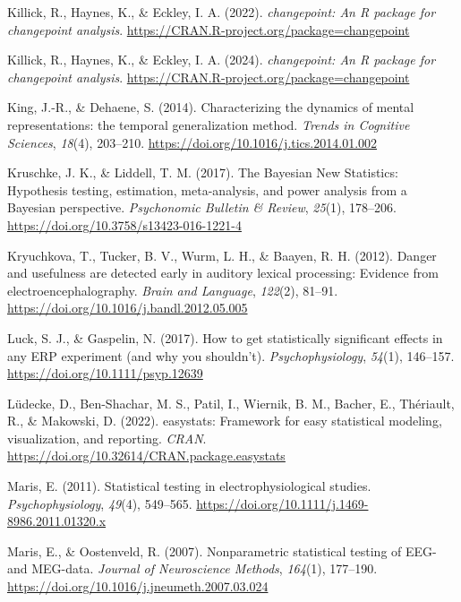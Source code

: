 \documentclass[
  doc,
  floatsintext,
  longtable,
  a4paper,
  nolmodern,
  notxfonts,
  notimes,
  colorlinks=true,linkcolor=blue,citecolor=blue,urlcolor=blue]{apa7}
\newlength{\cslhangindent}
\newenvironment{CSLReferences}[2] %
 {\begin{list}{}{%
  \setlength{\itemindent}{0pt}
  \setlength{\leftmargin}{0pt}
  \setlength{\parsep}{0pt}
  \ifodd #1
   \setlength{\leftmargin}{\cslhangindent}
   \setlength{\itemindent}{-1\cslhangindent}
  \fi
  \setlength{\itemsep}{#2\baselineskip}}}
 {\end{list}}
\begin{document}
\begin{CSLReferences}{1}{0}
Killick, R., Haynes, K., \& Eckley, I. A. (2022). \emph{{changepoint}:
An {R} package for changepoint analysis}.
\url{https://CRAN.R-project.org/package=changepoint}

Killick, R., Haynes, K., \& Eckley, I. A. (2024). \emph{{changepoint}:
An {R} package for changepoint analysis}.
\url{https://CRAN.R-project.org/package=changepoint}

King, J.-R., \& Dehaene, S. (2014). Characterizing the dynamics of
mental representations: the temporal generalization method. \emph{Trends
in Cognitive Sciences}, \emph{18}(4), 203--210.
\url{https://doi.org/10.1016/j.tics.2014.01.002}

Kruschke, J. K., \& Liddell, T. M. (2017). The Bayesian New Statistics:
Hypothesis testing, estimation, meta-analysis, and power analysis from a
Bayesian perspective. \emph{Psychonomic Bulletin \& Review},
\emph{25}(1), 178--206. \url{https://doi.org/10.3758/s13423-016-1221-4}

Kryuchkova, T., Tucker, B. V., Wurm, L. H., \& Baayen, R. H. (2012).
Danger and usefulness are detected early in auditory lexical processing:
Evidence from electroencephalography. \emph{Brain and Language},
\emph{122}(2), 81--91. \url{https://doi.org/10.1016/j.bandl.2012.05.005}

Luck, S. J., \& Gaspelin, N. (2017). How to get statistically
significant effects in any {ERP} experiment (and why you shouldn't).
\emph{Psychophysiology}, \emph{54}(1), 146--157.
\url{https://doi.org/10.1111/psyp.12639}

Lüdecke, D., Ben-Shachar, M. S., Patil, I., Wiernik, B. M., Bacher, E.,
Thériault, R., \& Makowski, D. (2022). {easystats}: Framework for easy
statistical modeling, visualization, and reporting. \emph{CRAN}.
\url{https://doi.org/10.32614/CRAN.package.easystats}

Maris, E. (2011). Statistical testing in electrophysiological studies.
\emph{Psychophysiology}, \emph{49}(4), 549--565.
\url{https://doi.org/10.1111/j.1469-8986.2011.01320.x}

Maris, E., \& Oostenveld, R. (2007). Nonparametric statistical testing
of EEG- and MEG-data. \emph{Journal of Neuroscience Methods},
\emph{164}(1), 177--190.
\url{https://doi.org/10.1016/j.jneumeth.2007.03.024}


\end{CSLReferences}
\end{document}
